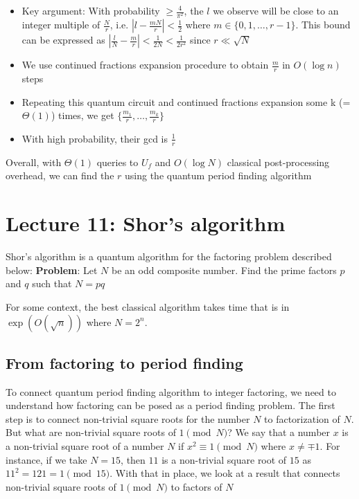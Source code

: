 \documentclass[11.5pt, paper=a4]{article}
\theoremstyle{definition}
\numberwithin{theorem}{section}
\begin{document}
\begin{itemize}
\begin{itemize}
        \item Key argument: With probability $\ge \frac{4}{\pi^2}$, the $l$ we observe will be close to an integer multiple of $\frac{N}{r}$, i.e. $|l - \frac{m N}{r}| < \frac{1}{2}$ where $m \in \{0, 1, \dots, r-1\}$. This bound can be expressed as  $|\frac{l}{N} - \frac{m }{r}| < \frac{1}{2 N} < \frac{1}{2 r^2}$ since $r \ll \sqrt{N}$
        \item We use continued fractions expansion procedure to obtain $\frac{m}{r}$ in $O(\log n)$ steps
        \item Repeating this quantum circuit and continued fractions expansion some k (= $\Theta(1)$) times, we get $\{\frac{m_1}{r}, \ldots, \frac{m_k}{r} \}$
        \item With high probability, their gcd is $\frac{1}{r}$
    \end{itemize}
\end{itemize}


Overall, with $\Theta(1)$ queries to $U_f$ and $O(\log N)$ classical post-processing overhead, we can find the $r$ using the quantum period finding algorithm

\section{Lecture 11: Shor's algorithm}
Shor's algorithm is a quantum algorithm for the factoring problem described below:
\newline
\textbf{Problem}: Let $N$ be an odd composite number. Find the prime factors $p$ and $q$ such that $N = p q$


For some context, the best classical algorithm takes time that is in $\exp(O(\sqrt{n}))$ where $N = 2^n$. 

\subsection{From factoring to period finding}
To connect quantum period finding algorithm to integer factoring, we need to understand how factoring can be posed as a period finding problem. The first step is to connect non-trivial square roots for the number $N$ to factorization of $N$. 
\newline 
But what are non-trivial square roots of $1\pmod{N}$? We say that a number $x$ is a non-trivial square root of a number $N$ if $x^2 \equiv 1\pmod{N}$ where $x \ne \mp 1$. For instance, if we take $N = 15$, then $11$ is a non-trivial square root of $15$ as $11^2 = 121 = 1\pmod{15}$.  With that in place, we look at a result that connects non-trivial square roots of $1\pmod{N}$ to factors of $N$
\end{document}

